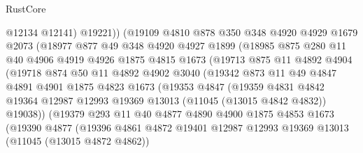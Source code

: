 \begin{lexlean}{RustCore}
\begin{coremodule}
                    @12134
                    @12141)
                  @19221))
              (@19109
                @4810
                @878
                @350
                @348
                @4920
                @4929
                @1679
                @2073
                (@18977
                  @877
                  @49
                  @348
                  @4920
                  @4927
                  @1899
                  (@18985
                    @875
                    @280
                    @11
                    @40
                    @4906
                    @4919
                    @4926
                    @1875
                    @4815
                    @1673
                    (@19713
                      @875
                      @11
                      @4892
                      @4904
                      (@19718
                        @874
                        @50
                        @11
                        @4892
                        @4902
                        @3040
                        (@19342
                          @873
                          @11
                          @49
                          @4847
                          @4891
                          @4901
                          @1875
                          @4823
                          @1673
                          (@19353
                            @4847
                            (@19359
                              @4831
                              @4842
                              @19364
                              @12987
                              @12993
                              @19369
                              @13013
                              (@11045 (@13015 @4842 @4832))
                              @19038))
                          (@19379
                            @293
                            @11
                            @40
                            @4877
                            @4890
                            @4900
                            @1875
                            @4853
                            @1673
                            (@19390
                              @4877
                              (@19396
                                @4861
                                @4872
                                @19401
                                @12987
                                @12993
                                @19369
                                @13013
                                (@11045 (@13015 @4872 @4862))

\end{coremodule}
\end{lexlean}
